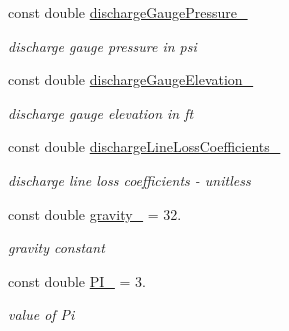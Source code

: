 \begin{DoxyCompactItemize}
\mbox{\label{class_head_tool_base_a52413462e822c4cfdc77f19671216116}} 
const double \hyperlink{class_head_tool_base_a52413462e822c4cfdc77f19671216116}{discharge\+Gauge\+Pressure\+\_\+}
\begin{DoxyCompactList}\small\item\em discharge gauge pressure in psi \end{DoxyCompactList}\item 
\mbox{\label{class_head_tool_base_af4e7ff936d367e96119b4a976ce2740f}} 
const double \hyperlink{class_head_tool_base_af4e7ff936d367e96119b4a976ce2740f}{discharge\+Gauge\+Elevation\+\_\+}
\begin{DoxyCompactList}\small\item\em discharge gauge elevation in ft \end{DoxyCompactList}\item 
\mbox{\label{class_head_tool_base_a02e59b19839499f82973a4b59690d5bd}} 
const double \hyperlink{class_head_tool_base_a02e59b19839499f82973a4b59690d5bd}{discharge\+Line\+Loss\+Coefficients\+\_\+}
\begin{DoxyCompactList}\small\item\em discharge line loss coefficients -\/ unitless \end{DoxyCompactList}\item 
\mbox{\label{class_head_tool_base_a106ba169bf4e10b7442659108f619209}} 
const double \hyperlink{class_head_tool_base_a106ba169bf4e10b7442659108f619209}{gravity\+\_\+} = 32.
\begin{DoxyCompactList}\small\item\em gravity constant \end{DoxyCompactList}\item 
\mbox{\label{class_head_tool_base_aa988ceec07264b1865d5d708b97b7450}} 
const double \hyperlink{class_head_tool_base_aa988ceec07264b1865d5d708b97b7450}{P\+I\+\_\+} = 3.
\begin{DoxyCompactList}\small\item\em value of Pi \end{DoxyCompactList}\end{DoxyCompactItemize}


